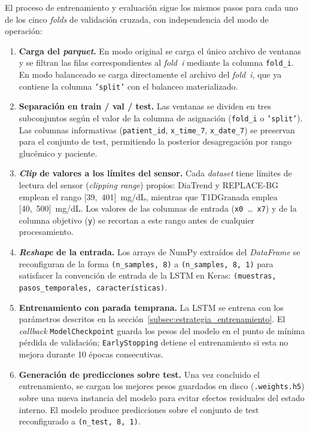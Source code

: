 El proceso de entrenamiento y evaluación sigue los mismos pasos para cada uno de los cinco \textit{folds} de validación cruzada, con independencia del modo de operación:

\begin{enumerate}
    \item \textbf{Carga del \textit{parquet}.} En modo original se carga el único archivo de ventanas y se filtran las filas correspondientes al \textit{fold~i} mediante la columna \texttt{fold\_i}. En modo balanceado se carga directamente el archivo del \textit{fold~i}, que ya contiene la columna \texttt{'split'} con el balanceo materializado.

    \item \textbf{Separación en train / val / test.} Las ventanas se dividen en tres subconjuntos según el valor de la columna de asignación (\texttt{fold\_i} o \texttt{'split'}). Las columnas informativas (\texttt{patient\_id}, \texttt{x\_time\_7}, \texttt{x\_date\_7}) se preservan para el conjunto de test, permitiendo la posterior desagregación por rango glucémico y paciente.

    \item \textbf{\textit{Clip} de valores a los límites del sensor.} Cada \textit{dataset} tiene límites de lectura del sensor (\textit{clipping range}) propios: DiaTrend y REPLACE-BG emplean el rango [39,~401]~mg/dL, mientras que T1DGranada emplea [40,~500]~mg/dL. Los valores de las columnas de entrada (\texttt{x0}~\ldots~\texttt{x7}) y de la columna objetivo (\texttt{y}) se recortan a este rango antes de cualquier procesamiento.

    \item \textbf{\textit{Reshape} de la entrada.} Los arrays de NumPy extraídos del \textit{DataFrame} se reconfiguran de la forma \texttt{(n\_samples,~8)} a \texttt{(n\_samples,~8,~1)} para satisfacer la convención de entrada de la LSTM en Keras: \texttt{(muestras, pasos\_temporales, características)}.

    \item \textbf{Entrenamiento con parada temprana.} La LSTM se entrena con los parámetros descritos en la sección~\ref{subsec:estrategia_entrenamiento}. El \textit{callback} \texttt{ModelCheckpoint} guarda los pesos del modelo en el punto de mínima pérdida de validación; \texttt{EarlyStopping} detiene el entrenamiento si esta no mejora durante 10 épocas consecutivas.

    \item \textbf{Generación de predicciones sobre test.} Una vez concluido el entrenamiento, se cargan los mejores pesos guardados en disco (\texttt{.weights.h5}) sobre una nueva instancia del modelo para evitar efectos residuales del estado interno. El modelo produce predicciones sobre el conjunto de test reconfigurado a \texttt{(n\_test,~8,~1)}.


\end{enumerate}
